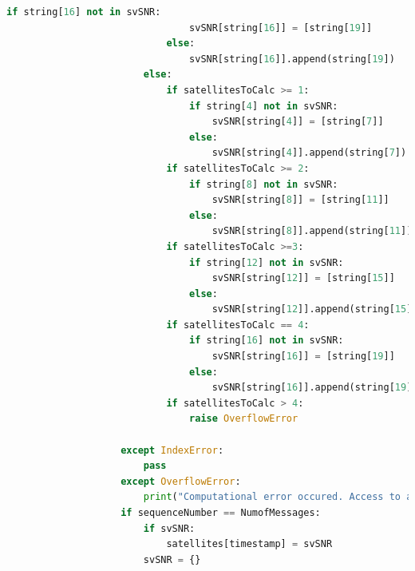 \begin{lstlisting}[language=Python, label=list:GSVParse, caption=Parsing GSV sentences for SVID carrier to noise ratio informaiton]
                            if string[16] not in svSNR:
                                svSNR[string[16]] = [string[19]]
                            else:
                                svSNR[string[16]].append(string[19])
                        else:
                            if satellitesToCalc >= 1:
                                if string[4] not in svSNR:
                                    svSNR[string[4]] = [string[7]]
                                else:
                                    svSNR[string[4]].append(string[7])
                            if satellitesToCalc >= 2:
                                if string[8] not in svSNR:
                                    svSNR[string[8]] = [string[11]]
                                else:
                                    svSNR[string[8]].append(string[11])
                            if satellitesToCalc >=3:
                                if string[12] not in svSNR:
                                    svSNR[string[12]] = [string[15]]
                                else:
                                    svSNR[string[12]].append(string[15])
                            if satellitesToCalc == 4:
                                if string[16] not in svSNR:
                                    svSNR[string[16]] = [string[19]]
                                else:
                                    svSNR[string[16]].append(string[19])
                            if satellitesToCalc > 4:
                                raise OverflowError
    
                    except IndexError:
                        pass
                    except OverflowError:
                        print("Computational error occured. Access to a value higher than available attempted")
                    if sequenceNumber == NumofMessages:
                        if svSNR:
                            satellites[timestamp] = svSNR
                        svSNR = {}
    \end{lstlisting}

